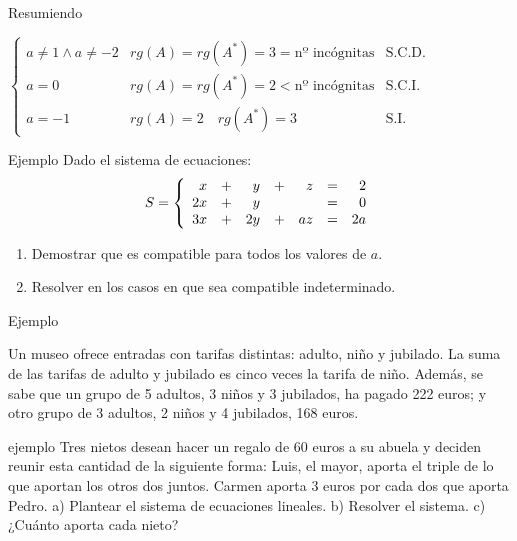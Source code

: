 \documentclass[9pt]{beamer}
\newenvironment{sistematres}{\left\lbrace \begin{array}{rrrrrrr}}{\end{array} \right.}
\begin{document}
\begin{frame}


Resumiendo 
\pause

$\left\lbrace 
\begin{array}{lll} 
a\neq 1 \wedge a \neq -2 & rg(A)=rg(A^*)=3=\text{nº incógnitas} & \text{S.C.D.} \\
a=0 & rg(A)=rg(A^*)=2 <\text{nº incógnitas} & \text{S.C.I.} \\
a=-1 & rg(A)=2 \quad rg(A^*)=3 & \text{S.I.}
\end{array}
\right.$
\end{frame}

\begin{frame}
\begin{exampleblock}{Ejemplo}
Dado el sistema de ecuaciones:
\[
S=\begin{sistematres}
	x & + & y & + & z & = & 2 \\
	2x & + & y & & & = & 0 \\
	3x & + & 2y & + & az & = &2a 
\end{sistematres}
\]

\begin{enumerate}
\item Demostrar que es compatible para todos los valores de $a$.
\item Resolver en los casos en que sea compatible indeterminado.
\end{enumerate}
\end{exampleblock}

\end{frame}

\begin{frame}
\begin{exampleblock}{Ejemplo}

Un museo ofrece entradas con tarifas distintas: adulto, niño y jubilado. La suma de las tarifas de adulto y jubilado es cinco veces la tarifa de niño. Además, se sabe que un grupo de 5 adultos, 3 niños y 3 jubilados, ha pagado 222 euros; y otro grupo de 3 adultos, 2 niños y 4 jubilados, 168 euros.
\end{exampleblock}
\end{frame}

\begin{frame}
\begin{exampleblock}{ejemplo}
Tres nietos desean hacer un regalo de 60 euros a su abuela y deciden reunir esta cantidad de la siguiente forma: Luis, el mayor, aporta el triple de lo que aportan los otros dos juntos. Carmen aporta 3 euros por cada dos que aporta Pedro.
a) Plantear el sistema de ecuaciones lineales.
b) Resolver el sistema.
c) ¿Cuánto aporta cada nieto?
\end{exampleblock}
\end{frame}
\end{document}
